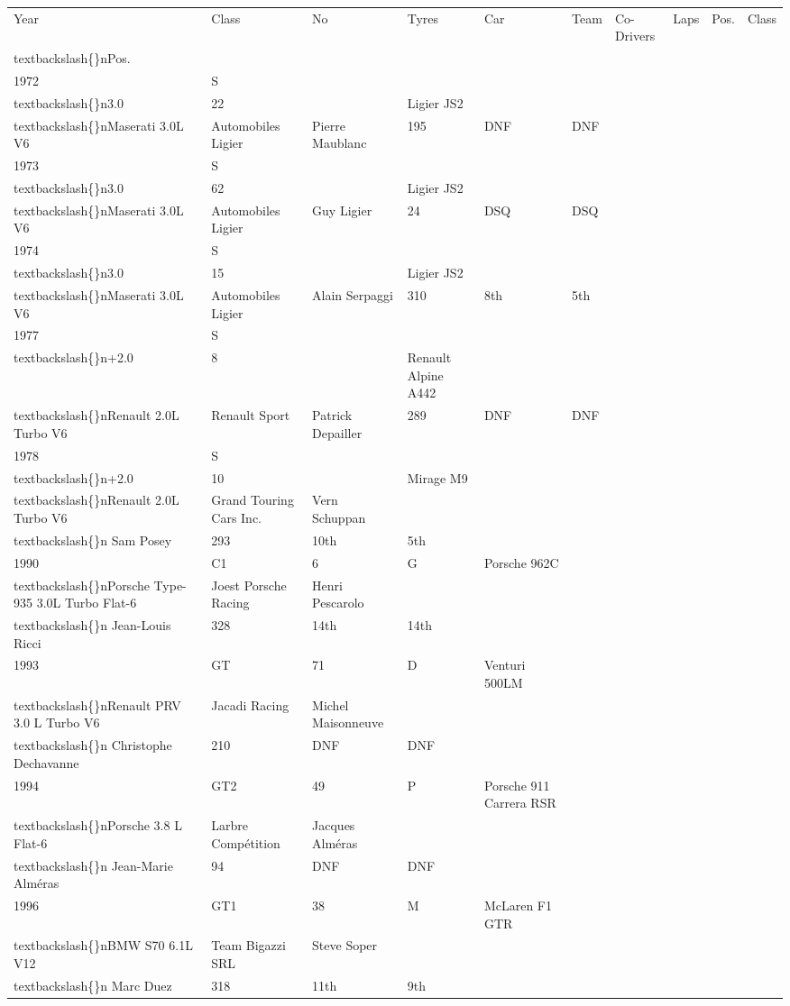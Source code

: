 \documentclass{article}
\begin{document}
\begin{tabular}{llllllllll}
\toprule
Year & Class & No & Tyres & Car & Team & Co-Drivers & Laps & Pos. & Class\\textbackslash\{\}nPos. \\
\midrule
1972 & S\\textbackslash\{\}n3.0 & 22 &  & Ligier JS2\\textbackslash\{\}nMaserati 3.0L V6 & Automobiles Ligier & Pierre Maublanc & 195 & DNF & DNF \\
1973 & S\\textbackslash\{\}n3.0 & 62 &  & Ligier JS2\\textbackslash\{\}nMaserati 3.0L V6 & Automobiles Ligier & Guy Ligier & 24 & DSQ & DSQ \\
1974 & S\\textbackslash\{\}n3.0 & 15 &  & Ligier JS2\\textbackslash\{\}nMaserati 3.0L V6 & Automobiles Ligier & Alain Serpaggi & 310 & 8th & 5th \\
1977 & S\\textbackslash\{\}n+2.0 & 8 &  & Renault Alpine A442\\textbackslash\{\}nRenault 2.0L Turbo V6 & Renault Sport & Patrick Depailler & 289 & DNF & DNF \\
1978 & S\\textbackslash\{\}n+2.0 & 10 &  & Mirage M9\\textbackslash\{\}nRenault 2.0L Turbo V6 & Grand Touring Cars Inc. & Vern Schuppan\\textbackslash\{\}n Sam Posey & 293 & 10th & 5th \\
1990 & C1 & 6 & G & Porsche 962C\\textbackslash\{\}nPorsche Type-935 3.0L Turbo Flat-6 & Joest Porsche Racing & Henri Pescarolo\\textbackslash\{\}n Jean-Louis Ricci & 328 & 14th & 14th \\
1993 & GT & 71 & D & Venturi 500LM\\textbackslash\{\}nRenault PRV 3.0 L Turbo V6 & Jacadi Racing & Michel Maisonneuve\\textbackslash\{\}n Christophe Dechavanne & 210 & DNF & DNF \\
1994 & GT2 & 49 & P & Porsche 911 Carrera RSR\\textbackslash\{\}nPorsche 3.8 L Flat-6 & Larbre Compétition & Jacques Alméras\\textbackslash\{\}n Jean-Marie Alméras & 94 & DNF & DNF \\
1996 & GT1 & 38 & M & McLaren F1 GTR\\textbackslash\{\}nBMW S70 6.1L V12 & Team Bigazzi SRL & Steve Soper\\textbackslash\{\}n Marc Duez & 318 & 11th & 9th \\
\bottomrule
\end{tabular}
\end{document}
